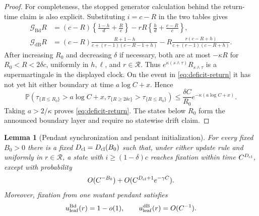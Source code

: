 \documentclass[11pt]{article}
\newtheorem{lemma}[theorem]{Lemma}
\theoremstyle{definition}
\theoremstyle{remark}
\newcommand{\Bd}{\mathrm{Bd}}
\newcommand{\dB}{\mathrm{dB}}
\newcommand{\Prob}{\mathbb P}
\begin{document}
\begin{proof}
For completeness, the stopped generator calculation behind the return-time
claim is also explicit.  Substituting $i=c-R$ in the two tables gives
\begin{align*}
 \mathcal G_{\Bd}R
 &=(c-R)\left\{\frac{1-h}{d}+\frac Rc\right\}
   -rR\left\{\frac hd+\frac{c-R}{c}\right\},\\
 \mathcal G_{\dB}R
 &=(c-R)\frac{R+1-h}{c+(r-1)(c-R-1+h)}
   -R\frac{r(c-R+h)}{c+(r-1)(c-R+h)}.
\end{align*}
After increasing $R_0$ and decreasing $\delta$ if necessary, both are at
most $-\kappa R$ for $R_0<R<2\delta c$, uniformly in $h,\ell$, and
$r\in\mathcal R$.  Thus
$e^{\kappa(s\wedge\tau)}R_{s\wedge\tau}$ is a supermartingale in the
displayed clock.  On the event in \eqref{eq:deficit-return} it has not yet
hit either boundary at time $a\log C+x$.  Hence
\[
 \Prob(\tau_{\{R\leq R_0\}}>a\log C+x,
       \tau_{\{R\geq2\delta c\}}>\tau_{\{R\leq R_0\}})
 \leq \frac{\delta C}{R_0}e^{-\kappa(a\log C+x)}.
\]
Taking $a>2/\kappa$ proves \eqref{eq:deficit-return}.  The states below
$R_0$ form the announced boundary layer and require no statewise drift claim.
\end{proof}

\begin{lemma}[Pendant synchronization and pendant initialization]
\label{lem:pendant-cleanup}
For every fixed $B_0>0$ there is a fixed $D_{\rm cl}=D_{\rm cl}(B_0)$ such
that, under either update
rule and uniformly in $r\in\mathcal R$, a state with
$i\geq(1-\delta)c$ reaches fixation within time $C^{D_{\rm cl}}$, except with
probability
\[
 O(C^{-B_0})+O(C^{D_{\rm cl}+1}e^{-\gamma C}).
\]
Moreover, fixation from one mutant pendant satisfies
\[
 u_{\rm leaf}^{\Bd}(r)=1-o(1),\qquad
 u_{\rm leaf}^{\dB}(r)=O(C^{-1}).
\]
\end{lemma}
\end{document}

